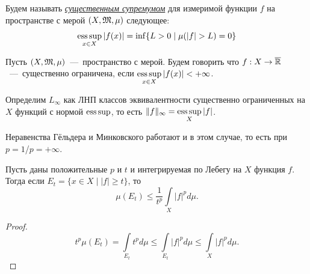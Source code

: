 \begin{definition}
    Будем называть \textit{\underline{существенным супремумом}} для измеримой функции $f$ на пространстве с мерой $(X, \mathfrak{M}, \mu)$ следующее: \[\operatorname*{ess\,sup}\limits_{x \in X}|f(x)| = \inf\{L > 0 \mid \mu(|f| > L) = 0\}\]
\end{definition}
\begin{definition}
    Пусть $(X, \mathfrak{M}, \mu)$~---~пространство с мерой. Будем говорить что $f: X \rightarrow \overline{\mathbb{R}}$~---~существенно ограничена, если $\operatorname*{ess\,sup}\limits_{x \in X} |f(x)| < +\infty$.
\end{definition}
\begin{definition}
    Определим $L_\infty$ как ЛНП классов эквивалентности существенно ограниченных на $X$ функций с нормой $\operatorname*{ess\,sup}$, то есть $\|f\|_\infty = \operatorname*{ess\,sup}\limits_X |f|$.
\end{definition}
\begin{note}
    Неравенства Гёльдера и Минковского работают и в этом случае, то есть при $p = 1$/$p = +\infty$.
\end{note}

\begin{theorem}
    Пусть даны положительные $p$ и $t$ и интегрируемая по Лебегу на $X$ функция $f$. Тогда если $E_t = \{x \in X \mid |f| \geq t\}$, то \[\mu(E_t) \leq \frac{1}{t^p}\int\limits_X |f|^pd\mu.\]
\end{theorem}
\begin{proof}
    \[t^p\mu(E_t) = \int\limits_{E_t} t^pd\mu \leq \int\limits_{E_t} |f|^pd\mu \leq \int\limits_{X}|f|^pd\mu.\]
\end{proof}